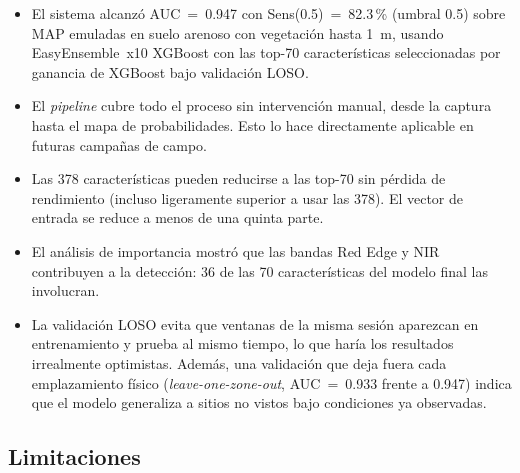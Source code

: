 \begin{itemize}
  \item El sistema alcanzó AUC~=~0.947 con Sens(0.5)~=~82.3\,\% (umbral 0.5)
    sobre \ac{MAP} emuladas en suelo arenoso con vegetación hasta \SI{1}{m},
    usando EasyEnsemble~x10 XGBoost con las top-70 características seleccionadas
    por ganancia de XGBoost bajo validación LOSO.
  \item El \textit{pipeline} cubre todo el proceso sin intervención manual,
    desde la captura hasta el mapa de probabilidades. Esto lo hace
    directamente aplicable en futuras campañas de campo.
  \item Las 378 características pueden reducirse a las top-70 sin pérdida de
    rendimiento (incluso ligeramente superior a usar las 378). El vector de
    entrada se reduce a menos de una quinta parte.
  \item El análisis de importancia mostró que las bandas Red Edge y \ac{NIR}
    contribuyen a la detección: 36 de las 70 características del modelo final las
    involucran.
  \item La validación \ac{LOSO} evita que ventanas de la misma sesión aparezcan en
    entrenamiento y prueba al mismo tiempo, lo que haría los resultados
    irrealmente optimistas. Además, una validación que deja fuera cada
    emplazamiento físico (\textit{leave-one-zone-out}, AUC~=~0.933 frente a 0.947)
    indica que el modelo generaliza a sitios no vistos bajo condiciones ya
    observadas.
\end{itemize}

\subsection{Limitaciones}

